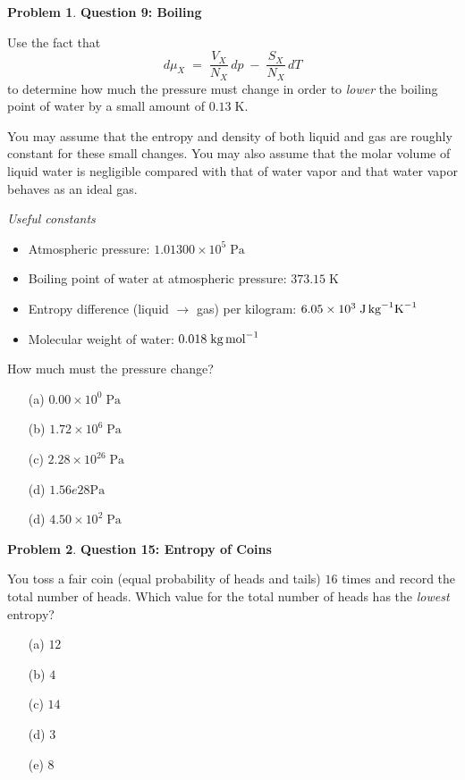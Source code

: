 \documentclass[10pt]{article}
\theoremstyle{definition} %
\newtheorem{problem}{Problem}
\theoremstyle{plain} %
\begin{document}
      \begin{problem}
        \textbf{Question 9: Boiling}
        
        Use the fact that
        \[
          d\mu_X \;=\; \frac{V_X}{N_X}\,dp \;-\; \frac{S_X}{N_X}\,dT
          \]
        to determine how much the pressure must change in order to \emph{lower}
        the boiling point of water by a small amount of \(0.13\;\text{K}\).
        
        You may assume that the entropy and density of both liquid and gas are
        roughly constant for these small changes.  You may also assume that the
        molar volume of liquid water is negligible compared with that of water
        vapor and that water vapor behaves as an ideal gas.
        
        \medskip
        \textit{Useful constants}
        \begin{itemize}
          \item Atmospheric pressure: \(1.01300\times10^{5}\;\text{Pa}\)
          \item Boiling point of water at atmospheric pressure: \(373.15\;\text{K}\)
          \item Entropy difference (liquid \(\rightarrow\) gas) per kilogram:
                \(6.05\times10^{3}\;\text{J\,kg}^{-1}\text{K}^{-1}\)
          \item Molecular weight of water: \(0.018\;\text{kg\,mol}^{-1}\)
        \end{itemize}
        
        \medskip
        How much must the pressure change?
        
        \begin{enumerate}
          \item[(a)] \(0.00\times10^{0}\;\text{Pa}\)
          \item[(b)] \(1.72\times10^{6}\;\text{Pa}\)
          \item[(c)] \(2.28\times10^{26}\;\text{Pa}\)
          \item[(d)] $1.56e28 \text{Pa} $ 
          \item[(d)] \(4.50\times10^{2}\;\text{Pa}\)
        \end{enumerate}
        \end{problem}
        \begin{problem}
          \textbf{Question 15: Entropy of Coins}
          
          You toss a fair coin (equal probability of heads and tails) \(16\) times and record the total number of heads.  
          Which value for the total number of heads has the \emph{lowest} entropy?
          
          \begin{enumerate}
            \item[(a)] \(12\)
            \item[(b)] \(4\)
            \item[(c)] \(14\)
            \item[(d)] \(3\)
            \item[(e)] \(8\)
          \end{enumerate}
          \end{problem}
\end{document}
